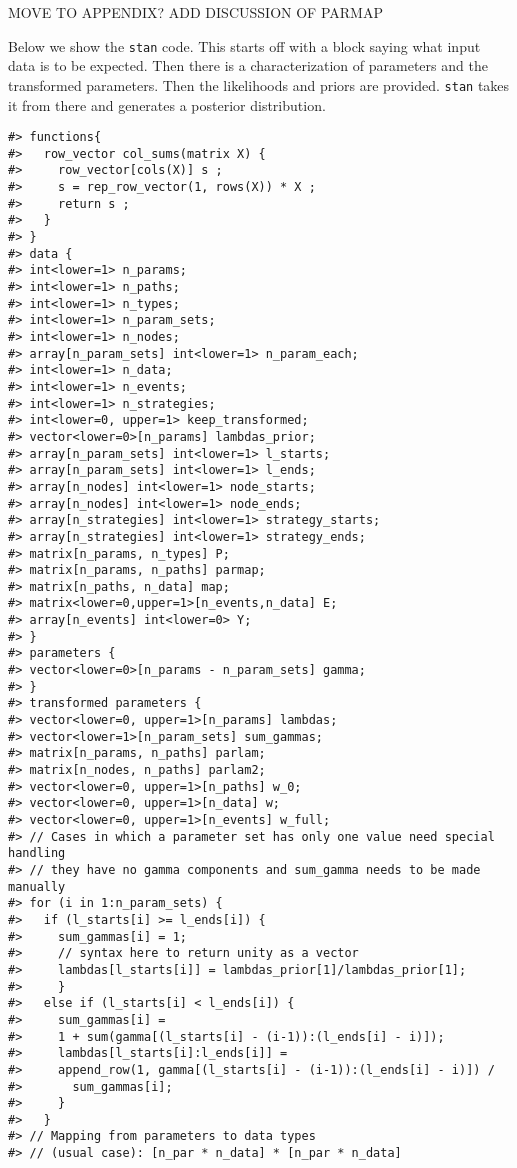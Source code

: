 \documentclass[
  11pt,
  article]{jss}
\begin{document}
MOVE TO APPENDIX? ADD DISCUSSION OF PARMAP

Below we show the \texttt{stan} code. This starts off with a block
saying what input data is to be expected. Then there is a
characterization of parameters and the transformed parameters. Then the
likelihoods and priors are provided. \texttt{stan} takes it from there
and generates a posterior distribution.

\begin{verbatim}
#> functions{
#>   row_vector col_sums(matrix X) {
#>     row_vector[cols(X)] s ;
#>     s = rep_row_vector(1, rows(X)) * X ;
#>     return s ;
#>   }
#> }
#> data {
#> int<lower=1> n_params;
#> int<lower=1> n_paths;
#> int<lower=1> n_types;
#> int<lower=1> n_param_sets;
#> int<lower=1> n_nodes;
#> array[n_param_sets] int<lower=1> n_param_each;
#> int<lower=1> n_data;
#> int<lower=1> n_events;
#> int<lower=1> n_strategies;
#> int<lower=0, upper=1> keep_transformed;
#> vector<lower=0>[n_params] lambdas_prior;
#> array[n_param_sets] int<lower=1> l_starts;
#> array[n_param_sets] int<lower=1> l_ends;
#> array[n_nodes] int<lower=1> node_starts;
#> array[n_nodes] int<lower=1> node_ends;
#> array[n_strategies] int<lower=1> strategy_starts;
#> array[n_strategies] int<lower=1> strategy_ends;
#> matrix[n_params, n_types] P;
#> matrix[n_params, n_paths] parmap;
#> matrix[n_paths, n_data] map;
#> matrix<lower=0,upper=1>[n_events,n_data] E;
#> array[n_events] int<lower=0> Y;
#> }
#> parameters {
#> vector<lower=0>[n_params - n_param_sets] gamma;
#> }
#> transformed parameters {
#> vector<lower=0, upper=1>[n_params] lambdas;
#> vector<lower=1>[n_param_sets] sum_gammas;
#> matrix[n_params, n_paths] parlam;
#> matrix[n_nodes, n_paths] parlam2;
#> vector<lower=0, upper=1>[n_paths] w_0;
#> vector<lower=0, upper=1>[n_data] w;
#> vector<lower=0, upper=1>[n_events] w_full;
#> // Cases in which a parameter set has only one value need special handling
#> // they have no gamma components and sum_gamma needs to be made manually
#> for (i in 1:n_param_sets) {
#>   if (l_starts[i] >= l_ends[i]) {
#>     sum_gammas[i] = 1;
#>     // syntax here to return unity as a vector
#>     lambdas[l_starts[i]] = lambdas_prior[1]/lambdas_prior[1];
#>     }
#>   else if (l_starts[i] < l_ends[i]) {
#>     sum_gammas[i] =
#>     1 + sum(gamma[(l_starts[i] - (i-1)):(l_ends[i] - i)]);
#>     lambdas[l_starts[i]:l_ends[i]] =
#>     append_row(1, gamma[(l_starts[i] - (i-1)):(l_ends[i] - i)]) /
#>       sum_gammas[i];
#>     }
#>   }
#> // Mapping from parameters to data types
#> // (usual case): [n_par * n_data] * [n_par * n_data]

\end{verbatim}
\end{document}
